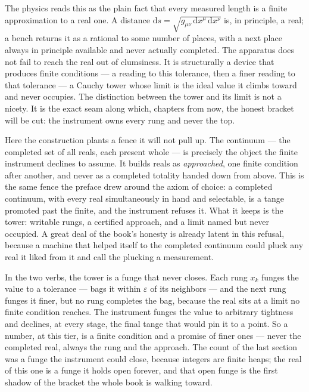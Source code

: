 The physics reads this as the plain fact that every measured length is a finite approximation to a real one. A distance
$\mathrm{d}s = \sqrt{g_{\mu\nu}\,\mathrm{d}x^\mu\,\mathrm{d}x^\nu}$ is, in principle, a real; a bench returns it as a rational
to some number of places, with a next place always in principle available and never actually completed. The apparatus does
not fail to reach the real out of clumsiness. It is structurally a device that produces finite conditions --- a reading to
this tolerance, then a finer reading to that tolerance --- a Cauchy tower whose limit is the ideal value it climbs toward and
never occupies. The distinction between the tower and its limit is not a nicety. It is the exact seam along which, chapters
from now, the honest bracket will be cut: the instrument owns every rung and never the top.

Here the construction plants a fence it will not pull up. The continuum --- the completed set of all reals, each present
whole --- is precisely the object the finite instrument declines to assume. It builds reals as \emph{approached}, one finite
condition after another, and never as a completed totality handed down from above. This is the same fence the preface drew
around the axiom of choice: a completed continuum, with every real simultaneously in hand and selectable, is a tange promoted
past the finite, and the instrument refuses it. What it keeps is the tower: writable rungs, a certified approach, and a limit
named but never occupied. A great deal of the book's honesty is already latent in this refusal, because a machine that
helped itself to the completed continuum could pluck any real it liked from it and call the plucking a measurement.

In the two verbs, the tower is a funge that never closes. Each rung $x_k$ funges the value to a tolerance --- bags it within
$\varepsilon$ of its neighbors --- and the next rung funges it finer, but no rung completes the bag, because the real sits at
a limit no finite condition reaches. The instrument funges the value to arbitrary tightness and declines, at every stage, the
final tange that would pin it to a point. So a number, at this tier, is a finite condition and a promise of finer ones ---
never the completed real, always the rung and the approach. The count of the last section was a funge the instrument could
close, because integers are finite heaps; the real of this one is a funge it holds open forever, and that open funge is the
first shadow of the bracket the whole book is walking toward.


